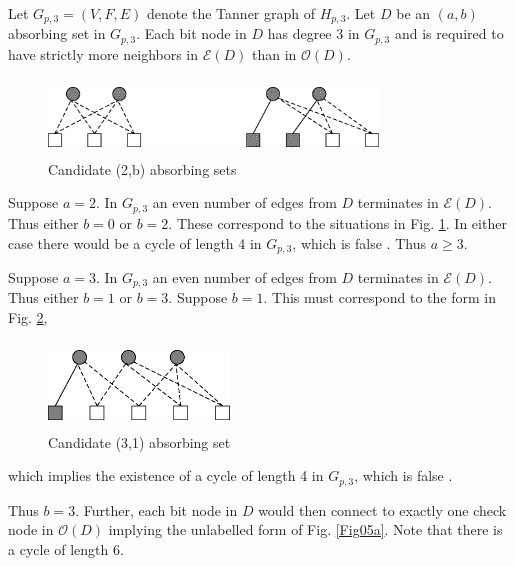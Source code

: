 Let $G_{p,3}=(V,F,E)$ denote the Tanner graph of $H_{p,3}$. Let
$D$ be an $(a,b)$ absorbing set in $G_{p,3}$. Each bit node in $D$
has degree $3$ in $G_{p,3}$ and is required to have strictly more
neighbors in $\mathcal{E}(D)$ than in $\mathcal{O}(D)$.

\begin{figure}
\center\includegraphics[width=3.45in,height=0.8in]{fig07.eps}
\caption{Candidate (2,b) absorbing sets}\label{Fig07}
\end{figure}
Suppose $a=2$. In $G_{p,3}$ an even number of edges from $D$
terminates in $\mathcal{E}(D)$. Thus either $b=0$ or $b=2$. These
correspond to the situations in Fig. \ref{Fig07}. In either case
there would be a cycle of length 4 in $G_{p,3}$, which is false
\cite{fan}. Thus $a\geq 3$.

Suppose $a=3$. In $G_{p,3}$ an even number of edges from $D$
terminates in $\mathcal{E}(D)$. Thus either $b=1$ or $b=3$.
Suppose $b=1$. This must correspond to the form in Fig.
\ref{Fig06},
\begin{figure}
\center\includegraphics[width=1.9in,height=0.9in]{fig06a.eps}
\caption{Candidate (3,1) absorbing set}\label{Fig06}
\end{figure}
which implies the existence of a cycle of length 4 in $G_{p,3}$,
which is false \cite{fan}.

Thus $b=3$. Further, each bit node in $D$ would then connect to
exactly one check node in $\mathcal{O}(D)$ implying the unlabelled
form of Fig. \ref{Fig05a}.
Note that there is a cycle of length 6.

